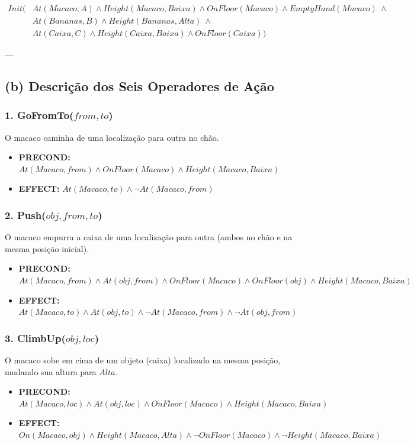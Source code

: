 \documentclass[a4paper,12pt]{article}
\begin{document}
\begin{align*}
	Init( & At(Macaco, A) \wedge Height(Macaco, Baixa) \wedge OnFloor(Macaco) \wedge EmptyHand(Macaco) \ \wedge \\
	& At(Bananas, B) \wedge Height(Bananas, Alta) \ \wedge \\
	& At(Caixa, C) \wedge Height(Caixa, Baixa) \wedge OnFloor(Caixa) )
\end{align*}

---

\subsection*{(b) Descrição dos Seis Operadores de Ação}

\subsubsection*{1. GoFromTo($from, to$)}
O macaco caminha de uma localização para outra no chão.
\begin{itemize}
	\item \textbf{PRECOND:} $At(Macaco, from) \wedge OnFloor(Macaco) \wedge Height(Macaco, Baixa)$
	\item \textbf{EFFECT:} $At(Macaco, to) \wedge \neg At(Macaco, from)$
\end{itemize}

\subsubsection*{2. Push($obj, from, to$)}
O macaco empurra a caixa de uma localização para outra (ambos no chão e na mesma posição inicial).
\begin{itemize}
	\item \textbf{PRECOND:} $At(Macaco, from) \wedge At(obj, from) \wedge OnFloor(Macaco) \wedge OnFloor(obj) \wedge Height(Macaco, Baixa)$
	\item \textbf{EFFECT:} $At(Macaco, to) \wedge At(obj, to) \wedge \neg At(Macaco, from) \wedge \neg At(obj, from)$
\end{itemize}

\subsubsection*{3. ClimbUp($obj, loc$)}
O macaco sobe em cima de um objeto (caixa) localizado na mesma posição, mudando sua altura para $Alta$.
\begin{itemize}
	\item \textbf{PRECOND:} $At(Macaco, loc) \wedge At(obj, loc) \wedge OnFloor(Macaco) \wedge Height(Macaco, Baixa)$
	\item \textbf{EFFECT:} $On(Macaco, obj) \wedge Height(Macaco, Alta) \wedge \neg OnFloor(Macaco) \wedge \neg Height(Macaco, Baixa)$
\end{itemize}
\end{document}
